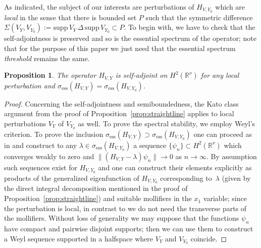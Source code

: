 \documentclass{article}
\numberwithin{equation}{section}
\newtheorem{proposition}[theorem]{Proposition}
\theoremstyle{definition}
\newcommand{\R}{\mathbb{R}}
\begin{document}
As indicated, the subject of our interests are perturbations of $H_{V,Y_0}$ which are \emph{local} in the sense that there is bounded set $P$ such that the symmetric difference $\Sigma(V_Y,V_{Y_0}):=\mathrm{supp}\,V_Y\,\Delta\, \mathrm{supp}\,V_{Y_0}\subset P$. To begin with, we have to check that the self-adjointness is preserved and so is the essential spectrum of the operator; note that for the purpose of this paper we just need that the essential spectrum \emph{threshold} remains the same.
 \begin{proposition} \label{prop:spess}
The operator $H_{V,Y}$ is self-adjoint on $H^2(\R^\nu)$ for any local perturbation and $\sigma_\mathrm{ess}(H_{V,Y})=\sigma_\mathrm{ess}(H_{V,Y_0})$.
 \end{proposition}
\begin{proof}
Concerning the self-adjointness and semiboundedness, the Kato class argument from the proof of Proposition~\ref{prop:straightline} applies to local perturbations $V_Y$ of $V_{Y_0}$ as well. To prove the spectral stability, we employ Weyl's criterion. To prove the inclusion $\sigma_\mathrm{ess}(H_{V,Y}) \supset \sigma_\mathrm{ess}(H_{V,Y_0})$ one can proceed as in \cite{Ex24} and construct to any $\lambda\in\sigma_\mathrm{ess}(H_{V,Y_0})$ a sequence $\{\psi_n\}\subset H^2(\R^\nu)$ which converges weakly to zero and $\|(H_{V,Y}-\lambda)\psi_n\|\to 0$ as $n\to\infty$. By assumption such sequences exist for $H_{V,Y_0}$ and one can construct their elements explicitly as products of the generalized eigenfunction of $H_{V,Y_0}$ corresponding to~$\lambda$ (given by the direct integral decomposition mentioned in the proof of Proposition~\ref{prop:straightline}) and suitable mollifiers in the $x_1$ variable; since the perturbation is local, in contrast to \cite{Ex24} we do not need the transverse parts of the mollifiers. Without loss of generality we may suppose that the functions $\psi_n$ have compact and pairwise disjoint supports; then we can use them to construct a Weyl sequence supported in a halfspace where $V_Y$ and $V_{Y_0}$ coincide.


\end{proof}
\end{document}
